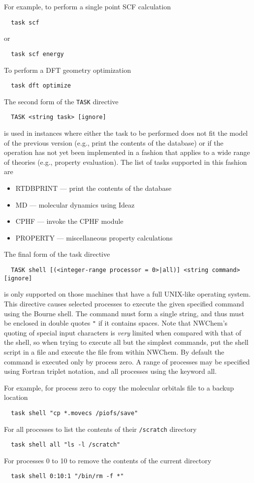 For example, to perform a single point SCF calculation
\begin{verbatim}
  task scf
\end{verbatim}
or
\begin{verbatim}
  task scf energy
\end{verbatim}
To perform a DFT geometry optimization
\begin{verbatim}
  task dft optimize
\end{verbatim}

The second form of the \verb+TASK+ directive
\begin{verbatim}
  TASK <string task> [ignore]
\end{verbatim}
is used in instances where either the task to be performed does not
fit the model of the previous version (e.g., print the contents of the
database) or if the operation has not yet been implemented in a
fashion that applies to a wide range of theories (e.g., property
evaluation).  The list of tasks supported in this fashion are
\begin{itemize}
  \item RTDBPRINT --- print the contents of the database
  \item MD --- molecular dynamics using Ideaz
  \item CPHF --- invoke the CPHF module
  \item PROPERTY --- miscellaneous property calculations
\end{itemize}

The final form of the task directive
\begin{verbatim}
  TASK shell [(<integer-range processor = 0>|all)] <string command> [ignore]
\end{verbatim}
is only supported on those machines that have a full UNIX-like
operating system.  This directive causes selected processes to execute
the given specified command using the Bourne shell.  The command must
form a single string, and thus must be enclosed in double quotes
\verb+"+ if it contains spaces.  Note that NWChem's quoting of
special input characters is {\em very} limited when compared with that
of the shell, so when trying to execute all but the simplest commands,
put the shell script in a file and execute the file from within
NWChem.  By default the command is executed only by process zero.  A
range of processes may be specified using Fortran triplet notation,
and all processes using the keyword all.

For example, for process zero to copy the molecular orbitals file to a
backup location
\begin{verbatim}
  task shell "cp *.movecs /piofs/save"
\end{verbatim}
For all processes to list the contents of their \verb+/scratch+
directory
\begin{verbatim}
  task shell all "ls -l /scratch"
\end{verbatim}
For processes 0 to 10 to remove the contents of the current directory
\begin{verbatim}
  task shell 0:10:1 "/bin/rm -f *"
\end{verbatim}

